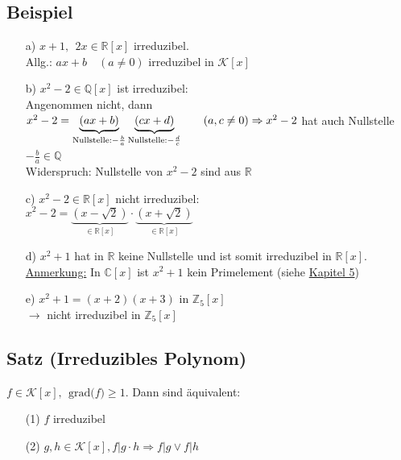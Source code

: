 \documentclass[a4paper, 12pt,titlepage, pdf, headsepline]{scrartcl}
\newcommand{\grad}[1]{\textrm{grad(}#1\textrm{)}}
\newcommand{\R}{\mathds{R}}
\newcommand{\K}{\mathcal{K}}
\newcommand{\uline}[1]{\underline{#1}}
\renewcommand{\>}{\rightarrow}
\renewcommand{\*}{\cdot}
\begin{document}
		      	\subsection{Beispiel}
		      	\begin{itemize}
		      		\item[a)]
		      		      $x+1,~~ 2x \in \R[x]$ irreduzibel.\\
		      		      Allg.: $ax +b \quad (a\neq 0)$ irreduzibel in $\K[x]$
		      		\item[b)]
		      		      $x^2 - 2 \in \mathds{Q}[x]$ ist irreduzibel: \\
		      		      Angenommen nicht, dann $x^2 - 2 = \underbrace{(ax + b)}_{\text{Nullstelle:} -\frac{b}{a}} \underbrace{(cx+d)}_{\text{Nullstelle:} -\frac{d}{c}}\qquad(a,c\neq0) \\
		      		      \Rightarrow x^2 -2$ hat auch Nullstelle $-\frac{b}{a} \in \mathds{Q}$~\Lightning\\
		      		      Widerspruch: Nullstelle von $x^2 -2$ sind aus $\R$
		      		\item[c)] $x^2 -2 \in \R[x]$ nicht irreduzibel: \\
		      		      $x^2 - 2 = \underbrace{(x-\sqrt{2})}_{\in \R[x]} \cdot \underbrace{(x+\sqrt{2})}_{\in \R[x]}$
		      		\item[d)] $x^2+1$ hat in $\R$ keine Nullstelle und ist somit irreduzibel in $\R[x]$. \\
		      		      \uline{Anmerkung:} In $\mathds{C}[x]$ ist $x^2 +1$ kein Primelement (siehe \hyperref[5]{Kapitel 5})
		      		\item[e)]
		      		      $x^2 +1 = (x+2)(x+3)$ in $\mathds{Z}_5[x]$\\
		      		      $\rightarrow$ nicht irreduzibel in $\mathds{Z}_5[x]$ 
		      	\end{itemize}
		      	\subsection{Satz (Irreduzibles Polynom)}
		      	$f \in \K[x], ~~\grad{f} \geq 1$. Dann sind äquivalent: 
		      	\begin{itemize}
		      		\item[(1)] $f$ irreduzibel
		      		\item[(2)] $g,h \in \K[x], f \vert g\cdot h \Rightarrow f \vert g \lor f\vert h$
		      	\end{itemize}
\end{document}
